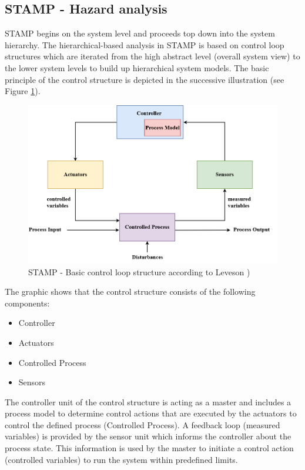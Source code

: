 \documentclass[review]{elsarticle}
\begin{document}
\subsection{STAMP - Hazard analysis}
STAMP begins on the system level and proceeds top down into the system hierarchy. The hierarchical-based analysis in STAMP is based on control loop structures which are iterated from the high abstract level (overall system view) to the lower system levels to build up hierarchical system models. The basic principle of the control structure is depicted in the successive illustration (see Figure \ref{fig:STAMPOverview}). 
\begin{figure}[!ht]
	\centering
	\includegraphics[scale=0.36]{images/STAMP_OVERVIEW}
	\caption[STAMP - Basic control loop structure]{STAMP - Basic control loop structure according to Leveson \cite{leveson2011engineering})}
	\label{fig:STAMPOverview}
\end{figure}
 
The graphic shows that the control structure consists of the following components:
\begin{itemize}
	\item Controller
	\item Actuators
	\item Controlled Process
	\item Sensors
\end{itemize}
The controller unit of the control structure is acting as a master and includes a process model to determine control actions that are executed by the actuators to control the defined process (Controlled Process). A feedback loop (measured variables) is provided by the sensor unit which informs the controller about the process state. This information is used by the master to initiate a control action (controlled variables) to run the system within predefined limits.
\end{document}
